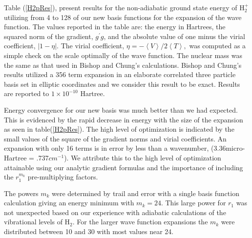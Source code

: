 \documentclass[12pt]{article}
\begin{document}
Table (\ref{H2pRes}), present results for the non-adiabatic ground state
energy of H$_{2}^{+}$ utilizing from 4 to 128 of our new basis functions for
the expansion of the wave function. The values reported in the table are: the
energy in Hartrees, the squared norm of the gradient, $g^{\prime}g$, and the
absolute value of one minus the virial coefficient, $\left|  1-\eta\right|  $.
The virial coefficient, $\eta=-\left\langle V\right\rangle /2\left\langle
T\right\rangle ,$ was computed as a simple check on the scale optimally of the
wave function. The nuclear mass was the same as that used in Bishop and
Chung's\cite{Bishop77} calculations. Bishop and Chung's results utilized a 356
term expansion in an elaborate correlated three particle basis set in elliptic
coordinates and we consider this result to be exact. Results are reported to
$1\times10^{-10}$ Hartree.

Energy convergence for our new basis was much better than we had expected.
This is evidenced by the rapid decrease in energy with the size of the
expansion as seen in table(\ref{H2pRes}). The high level of optimization is
indicated by the small values of the square of the gradient norms and virial
coefficients. An expansion with only 16 terms is in error by less than a
wavenumber, (3.36micro-Hartree = .737$cm^{-1}$). We attribute this to the high
level of optimization attainable using our analytic gradient formulas and the
importance of including the $r_{1}^{m_{k}}$ pre-multiplying factors.

The powers $m_{k}$ were determined by trail and error with a single basis
function calculation giving an energy minimum with $m_{k}=24$. This large
power for $r_{1}$ was not unexpected based on our experience with adiabatic
calculations of the vibrational levels of H$_{2}$\cite{Kinghorn97b}. For the
larger wave function expansions the $m_{k}$ were distributed between 10 and 30
with most values near 24.%
\end{document}
